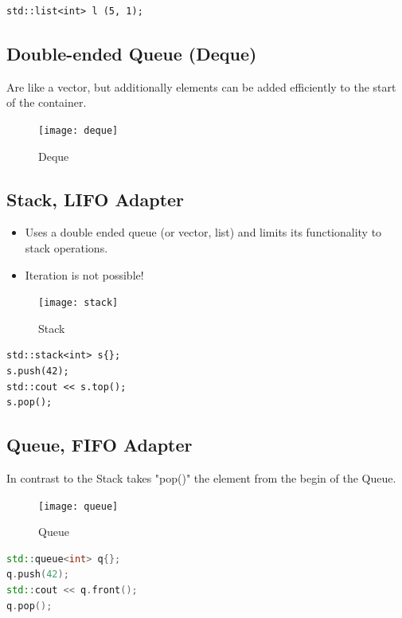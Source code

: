 \begin{lstlisting}
std::list<int> l (5, 1);
\end{lstlisting}


\subsection{Double-ended Queue (Deque)}
Are like a vector, but additionally elements can be added efficiently to the start of the container.

\begin{figure}[h!]
  \centering
  \texttt{[image: deque]}
  \caption{Deque}
\end{figure}

\subsection{Stack, LIFO Adapter}
\begin{itemize}
  \itemsep -0.5em 
  \item Uses a double ended queue (or vector, list) and limits its functionality to stack operations.
  \item Iteration is not possible!
\end{itemize}

\begin{figure}[h!]
  \centering
  \texttt{[image: stack]}
  \caption{Stack}
\end{figure}

\begin{lstlisting}
std::stack<int> s{}; 
s.push(42); 
std::cout << s.top(); 
s.pop();
\end{lstlisting}

\subsection{Queue, FIFO Adapter}
In contrast to the Stack takes "pop()" the element from the begin of the Queue. 

\begin{figure}[h!] 
  \centering
  \texttt{[image: queue]}
  \caption{Queue}
\end{figure}

\begin{lstlisting}[language=C++]
std::queue<int> q{};
q.push(42);
std::cout << q.front();
q.pop();
\end{lstlisting}






